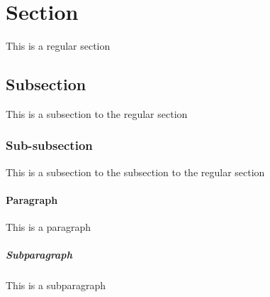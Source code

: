 \section{Section}
This is a regular section

\subsection{Subsection}
This is a subsection to the regular section


\subsubsection{Sub-subsection}
This is a subsection to the subsection to the regular section

\paragraph{Paragraph}
This is a paragraph

\subparagraph{Subparagraph}
This is a subparagraph
